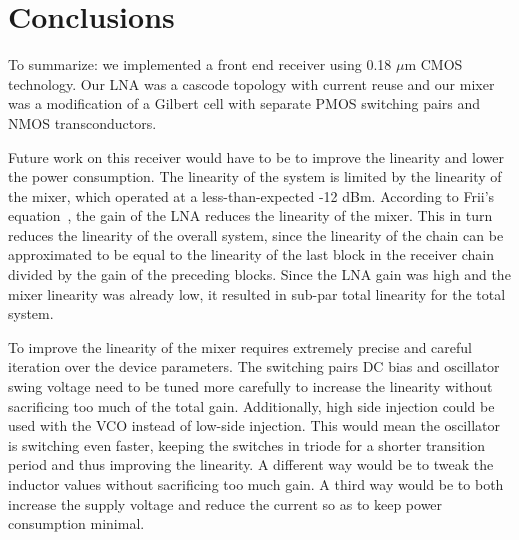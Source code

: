 \section{Conclusions}

To summarize: we implemented a front end receiver using 0.18 $\mu$m CMOS technology. Our LNA was a cascode topology with current reuse and our mixer was a modification of a Gilbert cell with separate PMOS switching pairs and NMOS transconductors. 

Future work on this receiver would have to be to improve the linearity and lower the power consumption. The linearity of the system is limited by the linearity of the mixer, which operated at a less-than-expected -12 dBm. According to Frii's equation~\cite{Razavi}, the gain of the LNA reduces the linearity of the mixer. This in turn reduces the linearity of the overall system, since the linearity of the chain can be approximated to be equal to the linearity of the last block in the receiver chain divided by the gain of the preceding blocks. Since the LNA gain was high and the mixer linearity was already low, it resulted in sub-par total linearity for the total system. 

To improve the linearity of the mixer requires extremely precise and careful iteration over the device parameters. The switching pairs DC bias and oscillator swing voltage need to be tuned more carefully to increase the linearity without sacrificing too much of the total gain. Additionally, high side injection could be used with the VCO instead of low-side injection. This would mean the oscillator is switching even faster, keeping the switches in triode for a shorter transition period and thus improving the linearity. A different way would be to tweak the inductor values without sacrificing too much gain. A third way would be to both increase the supply voltage and reduce the current so as to keep power consumption minimal.